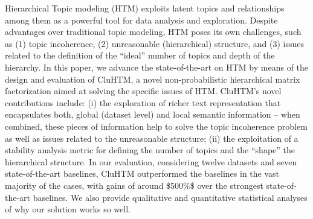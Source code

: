 Hierarchical Topic modeling (HTM) exploits latent topics and relationships among them as a powerful tool for data analysis and exploration. Despite advantages over traditional topic modeling, HTM poses its own challenges, such as (1) topic incoherence, (2) unreasonable (hierarchical) structure, and (3) issues related to the definition of the ``ideal'' number of topics and depth of the hierarchy. In this paper, we advance the state-of-the-art on HTM by means of the design and evaluation of CluHTM, a novel non-probabilistic hierarchical matrix factorization aimed at solving the specific issues of HTM. CluHTM's novel contributions include: (i) the exploration of richer text representation that encapsulates both, global (dataset level) and local semantic information -- when combined, these pieces of information help to solve the topic incoherence problem as well as issues related to the unreasonable structure; (ii) the exploitation of a stability analysis metric for defining the number of topics and the ``shape'' the hierarchical structure. In our evaluation, considering twelve datasets and seven state-of-the-art baselines, CluHTM outperformed the baselines in the vast majority of the cases, with gains of around \$500\%\$ over the strongest state-of-the-art baselines. We also provide qualitative and quantitative statistical analyses of why our solution works so well.
